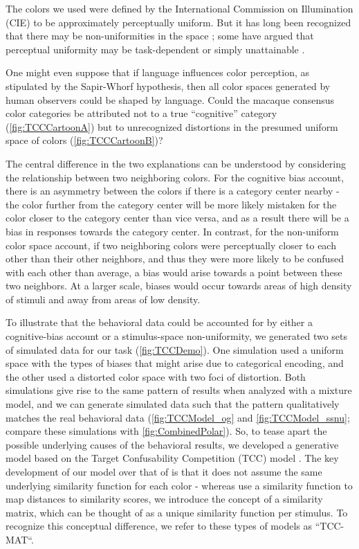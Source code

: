 The colors we used were defined by the International Commission on Illumination (CIE) to be approximately perceptually uniform. 
But it has long been recognized that there may be non-uniformities in the space \citep{stockman_colorimetry_2010}; some have argued that perceptual uniformity may be task-dependent or simply unattainable \citep{judd_ideal_1969}.

One might even suppose that if language influences color perception, as stipulated by the Sapir-Whorf hypothesis, then all color spaces generated by human observers could be shaped by language. 
Could the macaque consensus color categories be attributed not to a true “cognitive” category (\autoref{fig:TCCCartoonA}) but to unrecognized distortions in the presumed uniform space of colors (\autoref{fig:TCCCartoonB})? 

The central difference in the two explanations can be understood by considering the relationship between two neighboring colors. 
For the cognitive bias account, there is an asymmetry between the colors if there is a category center nearby - the color further from the category center will be more likely mistaken for the color closer to the category center than vice versa, and as a result there will be a bias in responses towards the category center. 
In contrast, for the non-uniform color space account, if two neighboring colors were perceptually closer to each other than their other neighbors, and thus they were more likely to be confused with each other than average, a bias would arise towards a point between these two neighbors. At a larger scale, biases would occur towards areas of high density of stimuli and away from areas of low density.

To illustrate that the behavioral data could be accounted for by either a cognitive-bias account or a stimulus-space non-uniformity, we generated two sets of simulated data for our task (\autoref{fig:TCCDemo}). 
One simulation used a uniform space with the types of biases that might arise due to categorical encoding, and the other used a distorted color space with two foci of distortion. 
Both simulations give rise to the same pattern of results when analyzed with a mixture model, and we can generate simulated data such that the pattern qualitatively matches the real behavioral data (\autoref{fig:TCCModel_og} and \autoref{fig:TCCModel_ssnu}; compare these simulations with \autoref{fig:CombinedPolar}). 
So, to tease apart the possible underlying causes of the behavioral results, we developed a generative model based on the Target Confusability Competition (TCC) model \citep{schurgin_psychophysical_2020}. 
The key development of our model over that of \cite{schurgin_psychophysical_2020} is that it does not assume the same underlying similarity function for each color - whereas \cite{schurgin_psychophysical_2020} use a similarity function to map distances to similarity scores, we introduce the concept of a similarity matrix, which can be thought of as a unique similarity function per stimulus. 
To recognize this conceptual difference, we refer to these types of models as ``TCC-MAT``.

